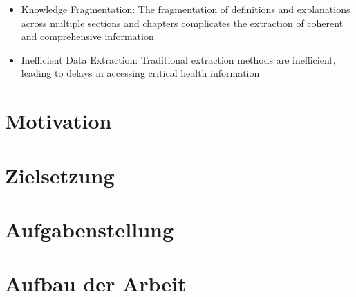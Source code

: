 \begin{itemize}
\item Knowledge Fragmentation: The fragmentation of definitions and explanations across multiple sections and chapters complicates the extraction of coherent and comprehensive information
\item Inefficient Data Extraction: Traditional extraction methods are inefficient, leading to delays in accessing critical health information

\end{itemize}
\section{Motivation}


\section{Zielsetzung}\label{sec:zielsetzung}


\section{Aufgabenstellung}



\section{Aufbau der Arbeit}

